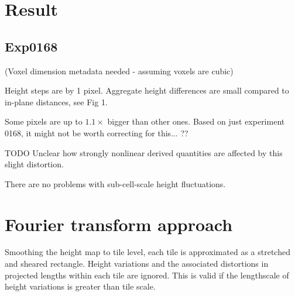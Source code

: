 \documentclass[10pt,a4paper]{article}
\begin{document}
\section{Result}
\subsection{Exp0168}
(Voxel dimension metadata needed - assuming voxels are cubic)

Height steps are by 1 pixel.  Aggregate height differences are small compared to in-plane distances, see Fig 1.

Some pixels are up to $1.1 \times$ bigger than other ones.  Based on just experiment 0168, it might not be worth correcting for this... ??  

TODO Unclear how strongly nonlinear derived quantities are affected by this slight distortion.

There are no problems with sub-cell-scale height fluctuations.

\section{Fourier transform approach}
Smoothing the height map to tile level, each tile is approximated as a stretched and sheared rectangle.  Height variations and the associated distortions in projected lengths within each tile are ignored.  This is valid if the lengthscale of height variations is greater than tile scale.  
\end{document}
